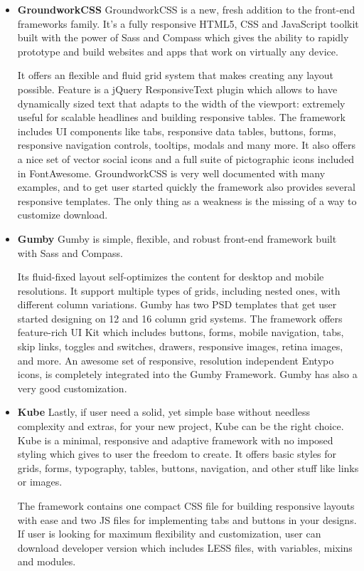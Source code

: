 \begin{itemize}
	\item \textbf{GroundworkCSS}
	\newline
	GroundworkCSS is a new, fresh addition to the front-end frameworks family. It’s a fully responsive HTML5, CSS and JavaScript toolkit built with the power of Sass and Compass which gives the ability to rapidly prototype and build websites and apps that work on virtually any device.

	It offers an flexible and fluid grid system that makes creating any layout possible. Feature is a jQuery ResponsiveText plugin which allows to have dynamically sized text that adapts to the width of the viewport: extremely useful for scalable headlines and building responsive tables. The framework includes UI components like tabs, responsive data tables, buttons, forms, responsive navigation controls, tooltips, modals and many more. It also offers a nice set of vector social icons and a full suite of pictographic icons included in FontAwesome. GroundworkCSS is very well documented with many examples, and to get user started quickly the framework also provides several responsive templates. The only thing as a weakness is the missing of a way to customize download.

	\item \textbf{Gumby}            
	\newline
	Gumby is simple, flexible, and robust front-end framework built with Sass and Compass.

	Its fluid-fixed layout self-optimizes the content for desktop and mobile resolutions. It support multiple types of grids, including nested ones, with different column variations. Gumby has two PSD templates that get user started designing on 12 and 16 column grid systems. The framework offers feature-rich UI Kit which includes buttons, forms, mobile navigation, tabs, skip links, toggles and switches, drawers, responsive images, retina images, and more. An awesome set of responsive, resolution independent Entypo icons, is completely integrated into the Gumby Framework. Gumby has also a very good customization. 
	
	\item \textbf{Kube}
	\newline
	Lastly, if user need a solid, yet simple base without needless complexity and extras, for your new project, Kube can be the right choice. Kube is a minimal, responsive and adaptive framework with no imposed styling which gives to user the freedom to create. It offers basic styles for grids, forms, typography, tables, buttons, navigation, and other stuff like links or images.

	The framework contains one compact CSS file for building responsive layouts with ease and two JS files for implementing tabs and buttons in your designs. If user is looking for maximum flexibility and customization, user can download developer version which includes LESS files, with variables, mixins and modules.
	\end{itemize}

